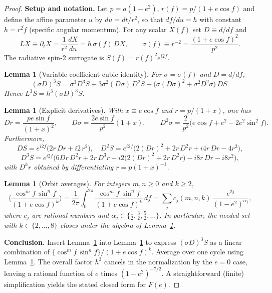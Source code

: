\documentclass[12pt, a4paper]{article}
\newtheorem{lemma}[theorem]{Lemma}
\begin{document}
\begin{proof}
\textbf{Setup and notation.}
Let $p=a(1-e^2)$, $r(f)=p/(1+e\cos f)$ and define the affine parameter $u$ by $du=dt/r^2$,
so that $df/du=h$ with constant $h=r^2\dot f$ (specific angular momentum).
For any scalar $X(f)$ set $D\equiv d/df$ and
\[
L X \equiv \partial_t X=\frac{1}{r^2}\frac{dX}{du}= h\,\sigma(f)\,D X,\qquad
\sigma(f)\equiv r^{-2}=\frac{(1+e\cos f)^2}{p^2}.
\]
The radiative spin-2 surrogate is $S(f)=r(f)^2 e^{i2f}$.

\begin{lemma}[Variable-coefficient cubic identity]\label{lem:cubic}
For $\sigma=\sigma(f)$ and $D=d/df$,
\[
(\sigma D)^{3} S
= \sigma^{3} D^{3} S
+ 3\sigma^{2} (D\sigma)\, D^{2} S
+ \big(\sigma(D\sigma)^{2} + \sigma^{2} D^{2}\sigma\big)\, D S.
\]
Hence $L^3S=h^{3}(\sigma D)^3 S$.
\end{lemma}

\begin{lemma}[Explicit derivatives]\label{lem:derivs}
With $x\equiv e\cos f$ and $r=p/(1+x)$, one has
\[
Dr=\frac{pe\sin f}{(1+x)^2},\qquad
D\sigma=\frac{2e\sin f}{p^2}(1+x),\qquad
D^{2}\sigma=\frac{2}{p^2}\big(e\cos f + e^2 -2e^2\sin^2 f\big).
\]
Furthermore,
\[
DS=e^{i2f}\big(2r\,Dr+i2\,r^2\big),\quad
D^{2}S=e^{i2f}\big(2(Dr)^2+2r\,D^{2}r+ i4r\,Dr -4r^2\big),
\]
\[
D^{3}S=e^{i2f}\Big(6Dr\,D^{2}r+2r\,D^{3}r + i2\big(2(Dr)^2+2r\,D^{2}r\big)
 - i8 r\,Dr - i8 r^2\Big),
\]
with $D^{k}r$ obtained by differentiating $r=p(1+x)^{-1}$.
\end{lemma}

\begin{lemma}[Orbit averages]\label{lem:avg}
For integers $m,n\ge0$ and $k\ge2$,
\[
\Big\langle \frac{\cos^{m}\!f\,\sin^{n}\!f}{(1+e\cos f)^{k}}\Big\rangle
=\frac{1}{2\pi}\!\int_{0}^{2\pi}\!\frac{\cos^{m}\!f\,\sin^{n}\!f}{(1+e\cos f)^{k}}\,df
=\sum_{j} c_{j}(m,n,k)\,\frac{e^{2j}}{(1-e^{2})^{\alpha_{j}}},
\]
where $c_j$ are rational numbers and $\alpha_j\in\{\tfrac12,\tfrac32,\tfrac52,\dots\}$.
In particular, the needed set with $k\in\{2,\dots,8\}$ closes under the algebra of
Lemma~\ref{lem:cubic}.
\end{lemma}

\textbf{Conclusion.}
Insert Lemma~\ref{lem:derivs} into Lemma~\ref{lem:cubic} to express $(\sigma D)^3S$
as a linear combination of $\{\cos^{m}\!f\,\sin^{n}\!f\}/(1+e\cos f)^{k}$.
Average over one cycle using Lemma~\ref{lem:avg}. The overall factor $h^{3}$ cancels
in the normalization by the $e=0$ case, leaving a rational function of $e$ times
$(1-e^{2})^{-7/2}$. A straightforward (finite) simplification yields the stated closed form
for $F(e)$.
\end{proof}
\end{document}
